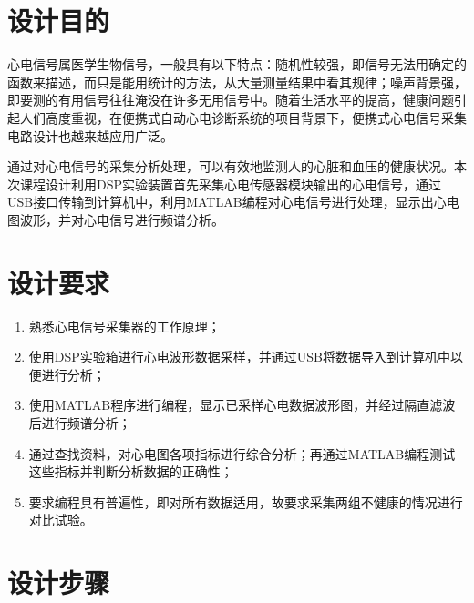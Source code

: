 \documentclass{article}
\begin{document}
\newpage

\pagestyle{fancy}
\renewcommand{\headrulewidth}{0pt}
\lhead{\small{\leftmark}}
\chead{\small{\rightmark}}
\lfoot{}
\cfoot{}
\rfoot{}



\tableofcontents
\listoffigures

\newpage


\section{设计目的}%
\label{sec:设计目的}

心电信号属医学生物信号，一般具有以下特点：随机性较强，即信号无法用确定的函数来描述，而只是能用统计的方法，从大量测量结果中看其规律；噪声背景强，即要测的有用信号往往淹没在许多无用信号中。随着生活水平的提高，健康问题引起人们高度重视，在便携式自动心电诊断系统的项目背景下，便携式心电信号采集电路设计也越来越应用广泛。 \cite{彭飞武2007论心电信号检测中的噪声与干扰及其消除方法}

通过对心电信号的采集分析处理，可以有效地监测人的心脏和血压的健康状况。本次课程设计利用DSP实验装置首先采集心电传感器模块输出的心电信号，通过USB接口传输到计算机中，利用MATLAB编程对心电信号进行处理，显示出心电图波形，并对心电信号进行频谱分析。 \cite{江培海2016基于}

\section{设计要求}%
\label{sec:设计要求}

\begin{enumerate}
	\item 熟悉心电信号采集器的工作原理；
	\item 使用DSP实验箱进行心电波形数据采样，并通过USB将数据导入到计算机中以便进行分析；
	\item 使用MATLAB程序进行编程，显示已采样心电数据波形图，并经过隔直滤波后进行频谱分析；
	\item 通过查找资料，对心电图各项指标进行综合分析；再通过MATLAB编程测试这些指标并判断分析数据的正确性；
	\item 要求编程具有普遍性，即对所有数据适用，故要求采集两组不健康的情况进行对比试验。
\end{enumerate}

\section{设计步骤}%
\label{sec:设计步骤}
\end{document}
